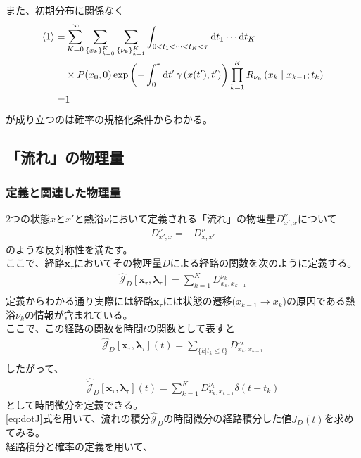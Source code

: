 \documentclass{ltjsarticle}
\begin{document}
また、初期分布に関係なく
\begin{align}
  \ev{1}=&\sum_{K=0}^{\infty}\sum_{\lbrace x_k\rbrace_{k=0}^K}\sum_{\lbrace\nu_k\rbrace_{k=1}^K}\int_{0<t_1<\cdots<t_K<\tau}\dd{t_1}\cdots \dd{t_K}\\
  &\times P(x_0,0)\exp\left(-\int_0^\tau \dd{t'}\gamma\left(x(t'),t'\right)\right)\prod_{k=1}^K R_{\nu_k}\left(x_k\mid x_{k-1};t_k\right)\\
  =&1
\end{align}
が成り立つのは確率の規格化条件からわかる。
\subsection{「流れ」の物理量}
\subsubsection{定義と関連した物理量}
2つの状態$x$と$x'$と熱浴$\nu$において定義される「流れ」の物理量$D^\nu_{x',x}$について\\
\begin{align}
  D^\nu_{x',x}=-D^\nu_{x,x'}
\end{align}
のような反対称性を満たす。\\
ここで、経路$\bm{x}_\tau$においてその物理量$D$による経路の関数を次のように定義する。
\begin{align}
  \hat{\mathcal{J}}_D[\bm{x}_\tau,\bm{\lambda}_\tau]=\sum^K_{k=1}D^{\nu_k}_{x_k,x_{k-1}}\\
\end{align}
定義からわかる通り実際には経路$\bm{x}_\tau$には状態の遷移($x_{k-1}\to x_k$)の原因である熱浴$\nu_k$の情報が含まれている。\\
ここで、この経路の関数を時間$t$の関数として表すと
\begin{align}
  \hat{\mathcal{J}}_D[\bm{x}_\tau,\bm{\lambda}_\tau](t)=\sum_{\lbrace k|t_k \le t\rbrace}D^{\nu_k}_{x_k,x_{k-1}}\\
\end{align}
したがって、
\begin{align}
  \hat{\dot{\mathcal{J}}}_D[\bm{x}_\tau,\bm{\lambda}_\tau](t)=\sum_{k=1}^K D^{\nu_k}_{x_{k},x_{k-1}}\delta(t-t_k)\label{eq:dotJ}
\end{align}
として時間微分を定義できる。\\
\eqref{eq:dotJ}式を用いて、流れの積分$\hat{\mathcal{J}}_D$の時間微分の経路積分した値$J_D(t)$を求めてみる。\\
経路積分と確率の定義を用いて、
\end{document}
